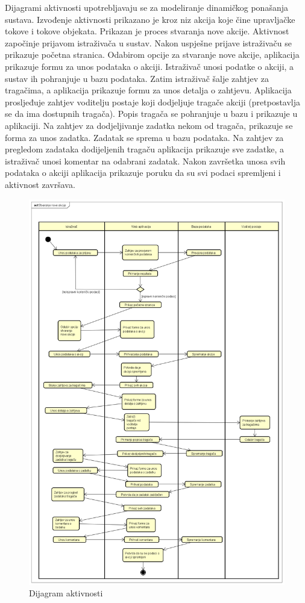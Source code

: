 			Dijagrami aktivnosti upotrebljavaju se za modeliranje dinamičkog ponašanja sustava. Izvođenje aktivnosti prikazano je kroz niz akcija koje čine upravljačke tokove i tokove objekata. Prikazan je proces stvaranja nove akcije. Aktivnost započinje prijavom istraživača u sustav. Nakon uspješne prijave istraživaču se prikazuje početna stranica. Odabirom opcije za stvaranje nove akcije, aplikacija prikazuje formu za unos podataka o akciji. Istraživač unosi podatke o akciji, a sustav ih pohranjuje u bazu podataka. Zatim istraživač šalje zahtjev za tragačima, a aplikacija prikazuje formu za unos detalja o zahtjevu. Aplikacija prosljeđuje zahtjev voditelju postaje koji dodjeljuje tragače akciji (pretpostavlja se da ima dostupnih tragača). Popis tragača se pohranjuje u bazu i prikazuje u aplikaciji. Na zahtjev za dodjeljivanje zadatka nekom od tragača, prikazuje se forma za unos zadatka. Zadatak se sprema u bazu podataka. Na zahtjev za pregledom zadataka dodijeljenih tragaču aplikacija prikazuje sve zadatke, a istraživač unosi komentar na odabrani zadatak. Nakon završetka unosa svih podataka o akciji aplikacija prikazuje poruku da su svi podaci spremljeni i aktivnost završava.
			
			\begin{figure}[H]
				\includegraphics[scale=0.4]{dijagrami/DijAktivnosti.png} 
				\centering
				\caption{Dijagram aktivnosti}
				\label{fig:promjene}
			\end{figure}
			
